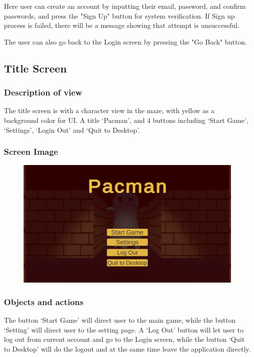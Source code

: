 \documentclass[11pt]{article}
\begin{document}
Here user can create an account by inputting their email, password, and confirm passwords, and press the "Sign Up" button for system verification. If Sign up process is failed, there will be a message showing that attempt is unsuccessful.

The user can also go back to the Login screen by pressing the "Go Back" button.

\subsection{Title Screen}
\subsubsection{Description of view}
The title screen is with a character view in the maze, with yellow as a background color for UI. A title `Pacman', and 4 buttons including `Start Game', `Settings', `Login Out' and `Quit to Desktop'. 
\subsubsection{Screen Image}
\begin{figure}[H]
    \centering
    \includegraphics*[scale=0.2]{UI1.0Main.png}
\end{figure}
\subsubsection{Objects and actions}
The button `Start Game' will direct user to the main game, while the button `Setting' will direct user to the setting page. A `Log Out' button will let user to log out from current account and go to the Login screen, while the button `Quit to Desktop' will do the logout and at the same time leave the application directly.
\end{document}
